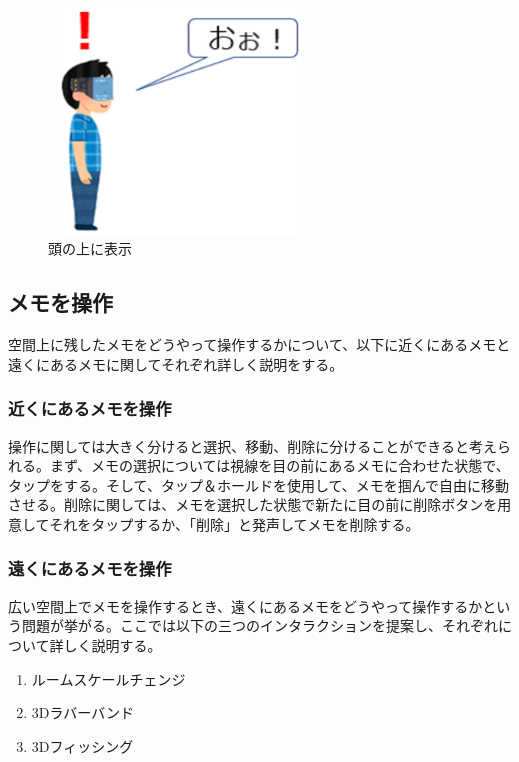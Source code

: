 \documentclass[11pt,a4j, titlepage]{jarticle} %
\begin{document}
\begin{figure}[H]
  \begin{center}
    \includegraphics[clip,height=6.0cm,width=7.0cm]{./kantanshi.eps}
    \caption{頭の上に表示}
    \label{fig:kantanshi}
  \end{center}
\end{figure}

\subsection{メモを操作}
空間上に残したメモをどうやって操作するかについて、以下に近くにあるメモと遠くにあるメモに関してそれぞれ詳しく説明をする。

\subsubsection{近くにあるメモを操作}
操作に関しては大きく分けると選択、移動、削除に分けることができると考えられる。まず、メモの選択については視線を目の前にあるメモに合わせた状態で、タップをする。そして、タップ＆ホールドを使用して、メモを掴んで自由に移動させる。削除に関しては、メモを選択した状態で新たに目の前に削除ボタンを用意してそれをタップするか、「削除」と発声してメモを削除する。

\subsubsection{遠くにあるメモを操作}
広い空間上でメモを操作するとき、遠くにあるメモをどうやって操作するかという問題が挙がる。ここでは以下の三つのインタラクションを提案し、それぞれについて詳しく説明する。

\begin{enumerate}[(1)]
 \item ルームスケールチェンジ
 \item 3Dラバーバンド
 \item 3Dフィッシング
\end{enumerate}
\end{document}
